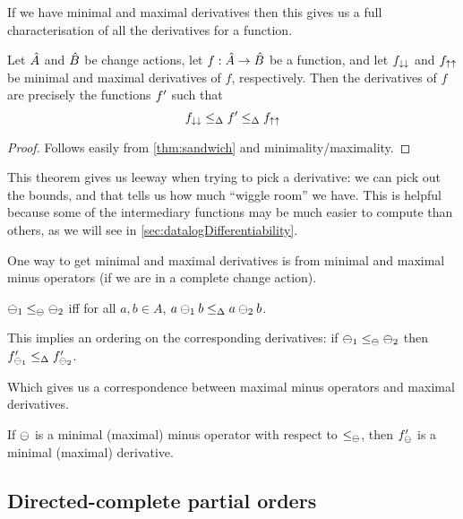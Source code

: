 If we have minimal and maximal derivatives then this gives us a full
characterisation of all the derivatives for a function.

\begin{thm}
\label{thm:derivativeCharacterization}
  Let $\hat{A}$ and $\hat{B}$ be change actions, let
  $f: \hat{A} \rightarrow \hat{B}$ be a function, and let $f_{\downarrow\downarrow}$ and
  $f_{\uparrow\uparrow}$ be minimal and maximal derivatives of $f$, respectively.
  Then the derivatives of $f$ are precisely
  the functions $f'$ such that
  \begin{displaymath}
    f_{\downarrow\downarrow} \leq_\Delta f' \leq_\Delta f_{\uparrow\uparrow}
  \end{displaymath}
\end{thm}
\ifproofs
\begin{proof}
  Follows easily from \cref{thm:sandwich} and minimality/maximality.
\end{proof}
\fi

This theorem gives us leeway when trying to pick a derivative: we can pick out the
bounds, and that tells us how much ``wiggle room'' we have. This is helpful
because some of the intermediary functions may be much easier to compute than
others, as we will see in \cref{sec:datalogDifferentiability}.

One way to get minimal and maximal derivatives is from minimal and maximal minus
operators (if we are in a complete change action).

\begin{defn}
  $\ominus_1 \leq_\ominus \ominus_2$ iff for all $a,b \in A$, $a \ominus_1 b
  \leq_\Delta a \ominus_2 b$.
\end{defn}

This implies an ordering on the corresponding derivatives: if $\ominus_1 \leq_\ominus \ominus_2$ then
$f'_{\ominus_1} \leq_\Delta f'_{\ominus_2}$.

Which gives us a correspondence between maximal minus operators and maximal derivatives.

\begin{prop}
  \label{prop:maximalMinusDerivatives}
  If $\ominus$ is a minimal (maximal) minus operator with respect to
  $\leq_\ominus$, then $f'_\ominus$ is a minimal (maximal) derivative.
\end{prop}

\subsection{Directed-complete partial orders}

